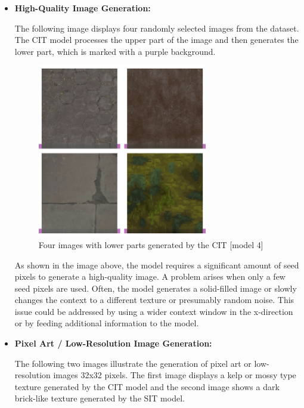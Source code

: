     \newpage
    \begin{itemize}
        \item \textbf{High-Quality Image Generation:}
    
            The following image displays four randomly selected images from the dataset. The CIT model processes the upper part of the image and then generates the lower part, which is marked with a purple background.
    
            \begin{figure}[H]
                \centering
                \includegraphics[width=0.7\textwidth]{imgs/GenExample1.png}
                \caption{Four images with lower parts generated by the CIT [model 4]}
                \label{fig:GenExample1}
            \end{figure}
    
            As shown in the image above, the model requires a significant amount of seed pixels to generate a high-quality image. A problem arises when only a few seed pixels are used. Often, the model generates a solid-filled image or slowly changes the context to a different texture or presumably random noise. This issue could be addressed by using a wider context window in the x-direction or by feeding additional information to the model.
    
        \item \textbf{Pixel Art / Low-Resolution Image Generation:}
        
            The following two images illustrate the generation of pixel art or low-resolution images 32x32 pixels. The first image displays a kelp or mossy type texture generated by the CIT model and the second image shows a dark brick-like texture generated by the SIT model.
    

\end{itemize}
